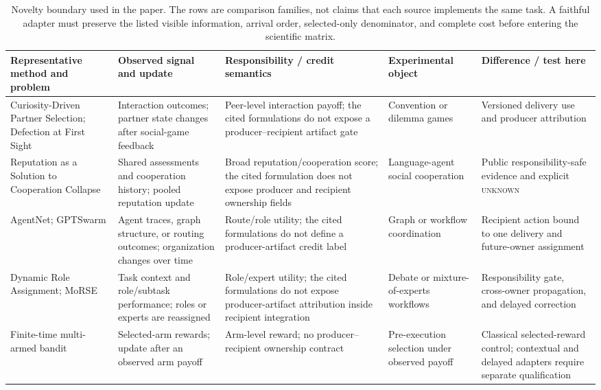 \documentclass[sigconf,anonymous]{aamas}
\newcommand{\unknown}{\textsc{unknown}}
\begin{document}
\begin{table}[t]
\centering\scriptsize
\setlength{\tabcolsep}{3.2pt}
\begin{tabular}{p{}p{}p{}p{}p{}}
\toprule
Representative method and problem & Observed signal and update & Responsibility / credit semantics & Experimental object & Difference / test here \\
\midrule
Curiosity-Driven Partner Selection; Defection at First Sight \cite{leung2025partner,russell2026partner} & Interaction outcomes; partner state changes after social-game feedback & Peer-level interaction payoff; the cited formulations do not expose a producer--recipient artifact gate & Convention or dilemma games & Versioned delivery use and producer attribution \\
Reputation as a Solution to Cooperation Collapse \cite{ren2026reputation} & Shared assessments and cooperation history; pooled reputation update & Broad reputation/cooperation score; the cited formulation does not expose producer and recipient ownership fields & Language-agent social cooperation & Public responsibility-safe evidence and explicit \unknown{} \\
AgentNet; GPTSwarm \cite{yang2025agentnet,zhuge2024gptswarm} & Agent traces, graph structure, or routing outcomes; organization changes over time & Route/role utility; the cited formulations do not define a producer-artifact credit label & Graph or workflow coordination & Recipient action bound to one delivery and future-owner assignment \\
Dynamic Role Assignment; MoRSE \cite{zhang2026dynamic,li2026morse} & Task context and role/subtask performance; roles or experts are reassigned & Role/expert utility; the cited formulations do not expose producer-artifact attribution inside recipient integration & Debate or mixture-of-experts workflows & Responsibility gate, cross-owner propagation, and delayed correction \\
Finite-time multi-armed bandit \cite{auer2002finite} & Selected-arm rewards; update after an observed arm payoff & Arm-level reward; no producer--recipient ownership contract & Pre-execution selection under observed payoff & Classical selected-reward control; contextual and delayed adapters require separate qualification \\
\bottomrule
\end{tabular}
\caption{Novelty boundary used in the paper. The rows are comparison families, not claims that each source implements the same task. A faithful adapter must preserve the listed visible information, arrival order, selected-only denominator, and complete cost before entering the scientific matrix.}
\label{tab:novelty}
\end{table}
\end{document}
